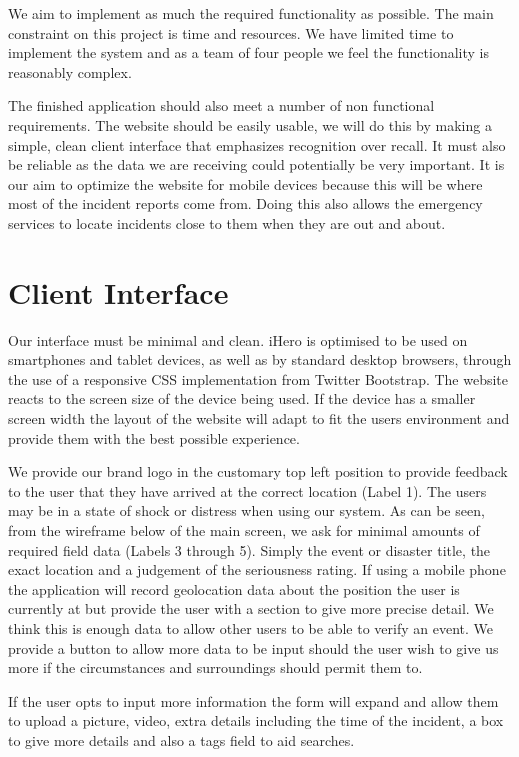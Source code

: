 \documentclass{sig-alt-release2}
\begin{document}
We aim to implement as much the required functionality as possible. The main constraint on this project is time and resources. We have limited time to implement the system and as a team of four people we feel the functionality is reasonably complex.                            

The finished application should also meet a number of non functional requirements. The website should be easily usable, we will do this by making a simple, clean client interface that emphasizes recognition over recall. It must also be reliable as the data we are receiving could potentially be very important. It is our aim to optimize the website for mobile devices because this will be where most of the incident reports come from. Doing this also allows the emergency services to locate incidents close to them when they are out and about.

\section{Client Interface}
Our interface must be minimal and clean. iHero is optimised to be used on smartphones and tablet devices, as well as by standard desktop browsers, through the use of a responsive CSS implementation from Twitter Bootstrap. The website reacts to the screen size of the device being used. If the device has a smaller screen width the layout of the website will adapt to fit the users environment and provide them with the best possible experience.

We provide our brand logo in the customary top left position to provide feedback to the user that they have arrived at the correct location (Label 1). The users may be in a state of shock or distress when using our system. As can be seen, from the wireframe below of the main screen, we ask for minimal amounts of required field data (Labels 3 through 5). Simply the event or disaster title, the exact location and a judgement of the seriousness rating. If using a mobile phone the application will record geolocation data about the position the user is currently at but provide the user with a section to give more precise detail. We think this is enough data to allow other users to be able to verify an event. We provide a button to allow more data to be input should the user wish to give us more if the circumstances and surroundings should permit them to.

If the user opts to input more information the form will expand and allow them to upload a picture, video, extra details including the time of the incident, a box to give more details and also a tags field to aid searches.
\end{document}
